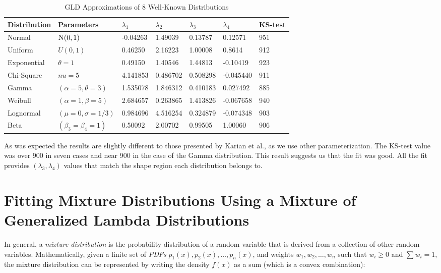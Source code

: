 \begin{table}[H]
\centering
\caption{GLD Approximations of 8 Well-Known Distributions}
\label{tab:gld_fit_other}
\begin{tabular}{l|l|l|l|l|l|l}
\hline
Distribution & Parameters                    & $\lambda_{1}$ & $\lambda_{2}$ & $\lambda_{3}$ & $\lambda_{4}$ & KS-test \\ \hline
Normal       & $\textsc{N}(0, 1)$                     & -0.04263   & 1.49039    & 0.13787    & 0.12571    & 951     \\ \hline
Uniform      & $U(0, 1)$                     & 0.46250     & 2.16223     & 1.00008     & 0.8614     & 912     \\ \hline
Exponential  & $\theta = 1$                  & 0.49150     & 1.40546     & 1.44813     & -0.10419    & 923     \\ \hline
Chi-Square   & $nu = 5$                      & 4.141853    & 0.486702    & 0.508298    & -0.045440   & 911     \\ \hline
Gamma        & $(\alpha = 5, \theta = 3)$    & 1.535078    & 1.846312    & 0.410183    & 0.027492    & 885     \\ \hline
Weibull      & $(\alpha = 1, \beta = 5)$     & 2.684657    & 0.263865    & 1.413826    & -0.067658   & 940     \\ \hline
Lognormal    & $(\mu = 0, \sigma = 1/3)$     & 0.984696    & 4.516254    & 0.324879    & -0.074348   & 903     \\ \hline
Beta         & $(\beta_{3} = \beta_{4} = 1)$ & 0.50092     & 2.00702     & 0.99505     & 1.00060     & 906     \\ \hline
\end{tabular}
\end{table}

As was expected the results are slightly different to those presented by Karian et al., as we use other parameterization. The KS-test value was over 900 in seven cases and near 900 in the case of the Gamma distribution. This result suggests us that the fit was good. All the fit provides $(\lambda_{3}, \lambda_{4})$ values that match the shape region each distribution belongs to.


\section{Fitting Mixture Distributions Using a Mixture of Generalized Lambda Distributions}\label{sec:gld_mixture}
In general, a \textit{mixture distribution} is the probability distribution of a random variable that is derived from a collection of other random variables. Mathematically, given a finite set of \textit{PDFs} $p_{1}(x),p_{2}(x),\ldots,p_{n}(x)$, and weights $w_{1},w_{2},\ldots,w_{n}$ such that $w_{i} \geq 0$ and $\sum w_{i}=1$, the mixture distribution can be represented by writing the density $f(x)$ as a sum (which is a convex combination):

